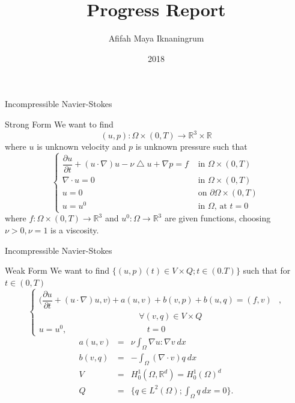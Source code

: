 \documentclass{beamer}
\newcommand{\R}{\mathbb{R}}
\begin{document}
\title{Progress Report}
\author{Afifah Maya Iknaningrum}
\date{2018}

\begin{frame}
\titlepage
\end{frame}

\begin{frame}{Incompressible Navier-Stokes}
\begin{block}{Strong Form}
	We want to find \[(u,p) : \Omega \times (0,T) \rightarrow \R^3 \times \R\] where $ u $ is unknown velocity and $ p $ is unknown pressure such that
	\begin{equation}\label{Navier-Stokes}
	\begin{cases}
	\dfrac{\partial u}{\partial t} + (u \cdot \nabla) u - \nu \bigtriangleup u + \nabla p = f & \text{ in } \Omega \times (0,T)\\
	\nabla \cdot u = 0 & \text{ in } \Omega \times (0,T)\\
	u = 0 & \text{ on } \partial \Omega \times (0,T)\\
	u = u^0 & \text{ in } \Omega \text{, at } t=0
	\end{cases}
	\end{equation}
	where $ f : \Omega \times (0,T) \rightarrow \R^3 $ and $ u^0 : \Omega \rightarrow \R^3 $ are given functions, choosing $ \nu > 0 , \nu = 1$ is a viscosity.
\end{block}
\end{frame}

\begin{frame}{Incompressible Navier-Stokes}
\begin{block}{Weak Form}
	We want to find $ \{ (u,p)(t) \in V \times Q ; t \in (0.T) \} $ such that for $ t \in (0,T) $
	\begin{equation} \label{NS_Weak} \nonumber
	\begin{cases}
	\big( \dfrac{\partial u}{\partial t} + (u \cdot \nabla)u,v \big) + a(u,v) + b(v,p) + b(u,q) = (f,v) & , \\ \hspace{5cm} \forall(v,q)\in V\times Q \\ u=u^{0} , \hspace{4cm} t=0
	\end{cases}
	\end{equation}
	\begin{eqnarray}\nonumber
	a(u,v) &=& \nu \int_{\Omega} \nabla u : \nabla v \ dx \\ \nonumber
	b(v,q) &=& - \int_{\Omega} (\nabla \cdot v) q \ dx \\ \nonumber
	V &=& H_{0}^{1}(\Omega, \R^d) = H_{0}^{1}(\Omega)^d \\ \nonumber
	Q &=& \{ q\in L^2(\Omega) ; \int_{\Omega} q \ dx=0 \}.
	\end{eqnarray}
\end{block}
\end{frame}
\end{document}

